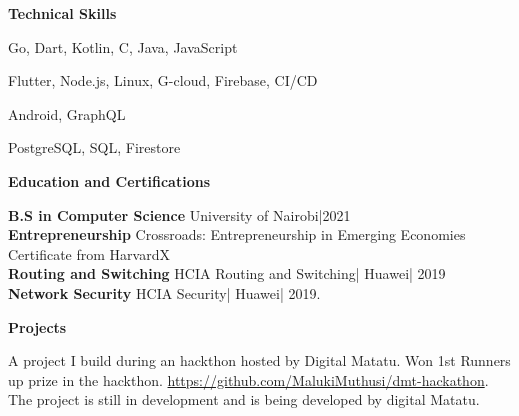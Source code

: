 \documentclass[a4paper]{article}
\begin{document}
\begin{center}
    {\Large \textbf{Technical Skills}}
\end{center}

\begin{description}[noitemsep]
    \item[Languages:] Go, Dart, Kotlin, C, Java, JavaScript
    \item[Platforms and tools:] Flutter, Node.js, Linux, G-cloud, Firebase, CI/CD
    \item[Frameworks:] Android, GraphQL
    \item[Databases:] PostgreSQL, SQL, Firestore
\end{description}

\begin{center}
    {\Large \textbf{Education and Certifications}}
\end{center}

\textbf{B.S in Computer Science} University of Nairobi|2021 \\
\textbf{Entrepreneurship} Crossroads: Entrepreneurship in Emerging Economies Certificate from HarvardX \\
\textbf{Routing and Switching} HCIA Routing and Switching| Huawei| 2019 \\
\textbf{Network Security} HCIA Security| Huawei| 2019. \par

\begin{center}
    {\Large \textbf{Projects} }
\end{center}

\begin{description}[noitemsep]
    \item[Digital Matatu Fare:] A project I build during an hackthon hosted by Digital Matatu. Won 1st Runners up prize in the hackthon. \url{ https://github.com/MalukiMuthusi/dmt-hackathon}. The project is still in development and is being developed by digital Matatu.
\end{description}

\end{document}
